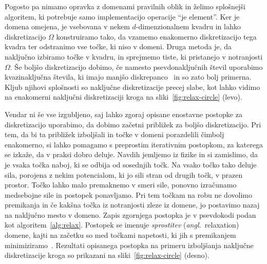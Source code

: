 \documentclass[12pt,a4paper,twoside]{article}
\theoremstyle{definition} %
\theoremstyle{plain} %
\numberwithin{equation}{section}
\newcommand{\ang}[1]{(\textit{angl.}\ #1)}
\begin{document}
Pogosto pa nimamo opravka z domenami pravilnih oblik in želimo splošnejši algoritem, ki potrebuje
samo implementacijo operacije ``je element''. Ker je domena omejena, je vsebovana v nekem
$d$-dimenzionalnem kvadru in lahko diskretizacijo $\Omega$ konstruiramo tako, da vzamemo enakomerno
diskretizacijo tega kvadra ter odstranimo vse točke, ki niso v domeni.  Druga metoda je, da
naključno izbiramo točke v kvadru, in sprejmemo tiste, ki pristanejo v notranjosti $\Omega$. Še
boljšo diskretizacijo dobimo, če namesto psevdonaključnih števil uporabimo kvazinaključna števila,
ki imajo manjšo diskrepanco~\cite{morokoff1994quasi} in so zato bolj primerna.
Kljub njihovi splošnosti so naključne diskretizacije precej slabe, kot lahko vidimo na
enakomerni naključni diskretizaciji kroga na sliki~\ref{fig:relax-circle} (levo).

Vendar ni še vse izgubljeno, saj lahko zgoraj opisane enostavne postopke za diskretizacijo
uporabimo, da dobimo začetni približek za boljšo diskretizacijo.  Pri tem, da bi ta približek
izboljšali in točke v domeni porazdelili čimbolj enakomerno, si lahko pomagamo s preprostim
iterativnim postopkom, za katerega se izkaže, da v praksi dobro deluje. Navdih jemljemo iz fizike in
si zamislimo, da je vsaka točka naboj, ki se odbija od sosednjih točk. Na vsako točko tako deluje
sila, porojena z nekim potencialom, ki jo sili stran od drugih točk, v prazen prostor. Točko lahko
malo premaknemo v smeri sile, ponovno izračunamo medsebojne sile in postopek ponavljamo. Pri tem
točkam na robu ne dovolimo premikanja in če kakšna točka iz notranjosti zleze iz domene, jo
postavimo nazaj na naključno mesto v domeno. Zapis zgornjega postopka je v psevdokodi podan kot
algoritem~\ref{alg:relax}. Postopek se imenuje \emph{sprostitev} \ang{relaxation} domene, kajti na
začetku so med točkami napetosti, ki jih s premikanjem
minimiziramo~\cite[razdelek~2.2]{kosec2016local}. Rezultati opisanega postopka na primeru
izboljšanja naključne diskretizacije kroga so prikazani na sliki~\ref{fig:relax-circle} (desno).
\end{document}
